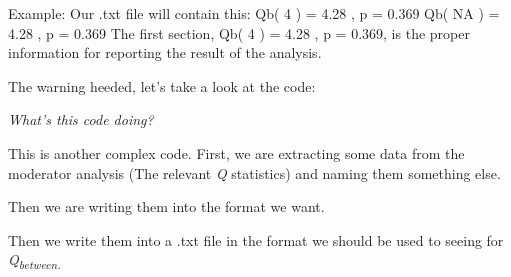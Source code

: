\documentclass[
]{book}
\newenvironment{Shaded}{\begin{snugshade}}{\end{snugshade}}
\newcommand{\AttributeTok}[1]{\textcolor[rgb]{0.13,0.29,0.53}{#1}}
\newcommand{\CommentTok}[1]{\textcolor[rgb]{0.56,0.35,0.01}{\textit{#1}}}
\newcommand{\ConstantTok}[1]{\textcolor[rgb]{0.56,0.35,0.01}{#1}}
\newcommand{\DecValTok}[1]{\textcolor[rgb]{0.00,0.00,0.81}{#1}}
\newcommand{\FunctionTok}[1]{\textcolor[rgb]{0.13,0.29,0.53}{\textbf{#1}}}
\newcommand{\NormalTok}[1]{#1}
\newcommand{\OtherTok}[1]{\textcolor[rgb]{0.56,0.35,0.01}{#1}}
\newcommand{\SpecialCharTok}[1]{\textcolor[rgb]{0.81,0.36,0.00}{\textbf{#1}}}
\newcommand{\StringTok}[1]{\textcolor[rgb]{0.31,0.60,0.02}{#1}}
\begin{document}
Example: Our .txt file will contain this: Qb( 4 ) = 4.28 , p = 0.369 Qb( NA ) = 4.28 , p = 0.369 The first section, Qb( 4 ) = 4.28 , p = 0.369, is the proper information for reporting the result of the analysis.

The warning heeded, let's take a look at the code:

\begin{Shaded}
\end{Shaded}

\emph{What's this code doing?}

This is another complex code. First, we are extracting some data from the moderator analysis (The relevant \emph{Q} statistics) and naming them something else.

Then we are writing them into the format we want.

Then we write them into a .txt file in the format we should be used to seeing for \emph{Q\textsubscript{between.}}
\end{document}
